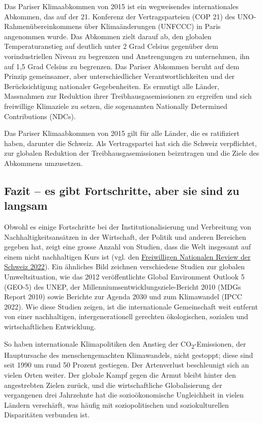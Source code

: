 \documentclass[
  nswissgerman,
  a4paper,
  openany]{book}
\begin{document}
Das Pariser Klimaabkommen von 2015 ist ein wegweisendes internationales
Abkommen, das auf der 21. Konferenz der Vertragsparteien (COP 21) des
UNO-Rahmenübereinkommens über Klimaänderungen (UNFCCC) in Paris
angenommen wurde. Das Abkommen zielt darauf ab, den globalen
Temperaturanstieg auf deutlich unter 2 Grad Celsius gegenüber dem
vorindustriellen Niveau zu begrenzen und Anstrengungen zu unternehmen,
ihn auf 1,5 Grad Celsius zu begrenzen. Das Pariser Abkommen beruht auf
dem Prinzip gemeinsamer, aber unterschiedlicher Verantwortlichkeiten und
der Berücksichtigung nationaler Gegebenheiten. Es ermutigt alle Länder,
Massnahmen zur Reduktion ihrer Treibhausgasemissionen zu ergreifen und
sich freiwillige Klimaziele zu setzen, die sogenannten Nationally
Determined Contributions (NDCs).

Das Pariser Klimaabkommen von 2015 gilt für alle Länder, die es
ratifiziert haben, darunter die Schweiz. Als Vertragspartei hat sich die
Schweiz verpflichtet, zur globalen Reduktion der Treibhausgasemissionen
beizutragen und die Ziele des Abkommens umzusetzen.

\subsection{Fazit -- es gibt Fortschritte, aber sie sind zu
langsam}\label{fazit-es-gibt-fortschritte-aber-sie-sind-zu-langsam}

Obwohl es einige Fortschritte bei der Institutionalisierung und
Verbreitung von Nachhaltigkeitsansätzen in der Wirtschaft, der Politik
und anderen Bereichen gegeben hat, zeigt eine grosse Anzahl von Studien,
dass die Welt insgesamt auf einem nicht nachhaltigen Kurs ist (vgl. den
\href{https://www.sdgital2030.ch/countryreport}{Freiwilligen Nationalen
Review der Schweiz 2022}). Ein ähnliches Bild zeichnen verschiedene
Studien zur globalen Umweltsituation, wie das 2012 veröffentlichte
Global Environment Outlook 5 (GEO-5) des UNEP, der
Millenniumsentwicklungsziele-Bericht 2010 (MDGs Report 2010) sowie
Berichte zur Agenda 2030 und zum Klimawandel (IPCC 2022). Wie diese
Studien zeigen, ist die internationale Gemeinschaft weit entfernt von
einer nachhaltigen, intergenerationell gerechten ökologischen, sozialen
und wirtschaftlichen Entwicklung.

So haben internationale Klimapolitiken den Anstieg der
CO\textsubscript{2}-Emissionen, der Hauptursache des menschengemachten
Klimawandels, nicht gestoppt; diese sind seit 1990 um rund 50 Prozent
gestiegen. Der Artenverlust beschleunigt sich an vielen Orten weiter.
Der globale Kampf gegen die Armut bleibt hinter den angestrebten Zielen
zurück, und die wirtschaftliche Globalisierung der vergangenen drei
Jahrzehnte hat die sozioökonomische Ungleichheit in vielen Ländern
verschärft, was häufig mit soziopolitischen und soziokulturellen
Disparitäten verbunden ist.
\end{document}
